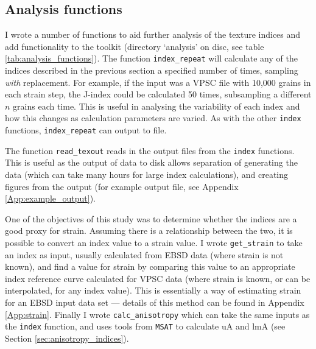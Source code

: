 \documentclass[a4paper,12pt,twoside]{report}
\numberwithin{equation}{chapter}
\begin{document}
\subsection{Analysis functions}

I wrote a number of functions to aid further analysis of the texture indices and add functionality to the toolkit (directory \lq{}analysis\rq{} on disc, see table \ref{tab:analysis_functions}). The function \texttt{index\_{}repeat} will calculate any of the indices described in the previous section a specified number of times, sampling \emph{with} replacement. For example, if the input was a VPSC file with 10,000 grains in each strain step, the J-index could be calculated 50 times, subsampling a different $n$ grains each time. This is useful in analysing the variability of each index and how this changes as calculation parameters are varied.  As with the other \texttt{index} functions, \texttt{index\_{}repeat} can output to file.

The function \texttt{read\_{}texout} reads in the output files from the \texttt{index} functions. This is useful as the output of data to disk allows separation of generating the data (which can take many hours for large index calculations), and creating figures from the output (for example output file, see Appendix \ref{App:example_output}).

One of the objectives of this study was to determine whether the indices are a good proxy for strain. Assuming there is a relationship between the two, it is possible to convert an index value to a strain value. I wrote \texttt{get\_{}strain} to take an index as input, usually calculated from EBSD data (where strain is not known), and find a value for strain by comparing this value to an appropriate index reference curve calculated for VPSC data (where strain is known, or can be interpolated, for any index value). This is essentially a way of estimating strain for an EBSD input data set --- details of this method can be found in Appendix \ref{App:strain}. Finally I wrote \texttt{calc\_{}anisotropy} which can take the same inputs as the \texttt{index} function, and uses tools from \texttt{MSAT} to calculate uA and lmA (see Section \ref{sec:anisotropy_indices}).
\end{document}
